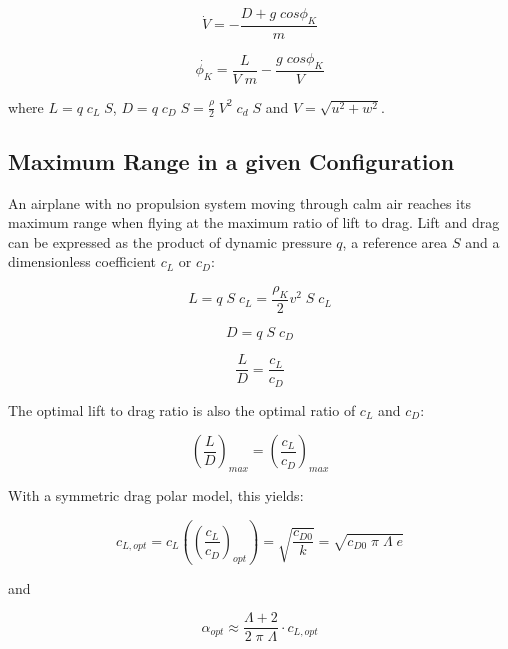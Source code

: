 \begin{equation}
\dot{V} = -\frac{D + g \; cos\phi_K}{m}
\end{equation}

\begin{equation}
\dot{\phi_K} = \frac{L}{V \; m} - \frac{g \; cos{\phi_K}}{V} 
\label{eq:dotgamma}
\end{equation}

where $L = q \; c_L \; S$, $D = q \; c_D \; S = \frac{\rho}{2} \; V^2 \; c_d \; S$ and $V=\sqrt{u^2+w^2}$.

\subsection{Maximum Range in a given Configuration}

An airplane with no propulsion system moving through calm air reaches its maximum range when flying at the maximum ratio of lift to drag. Lift and drag can be expressed as the product of dynamic pressure $q$, a reference area $S$ and a dimensionless coefficient $c_L$ or $c_D$:

\begin{equation}
L = q \; S \; c_L = \frac{\rho_K}{2} v^2 \; S \; c_L
\end{equation}  

\begin{equation}
D = q \; S \; c_D
\end{equation}

\begin{equation}
\frac{L}{D} = \frac{c_L}{c_D}
\end{equation}

The optimal lift to drag ratio is also the optimal ratio of $c_L$ and $c_D$:

\begin{equation}
\left(\frac{L}{D}\right)_{max} = \left(\frac{c_L}{c_D}\right)_{max}
\end{equation}

With a symmetric drag polar model, this yields:

\begin{equation}
c_{L,opt}=c_L\left(\left(\frac{c_L}{c_D}\right)_{opt}\right) = \sqrt{\frac{c_{D0}}{k}}=\sqrt{c_{D0}\;\pi\;\Lambda\;e}
\end{equation}

and

\begin{equation}
\alpha_{opt} \approx \frac{\Lambda+2}{2\;\pi\;\Lambda}\cdot c_{L,opt}
\end{equation}

